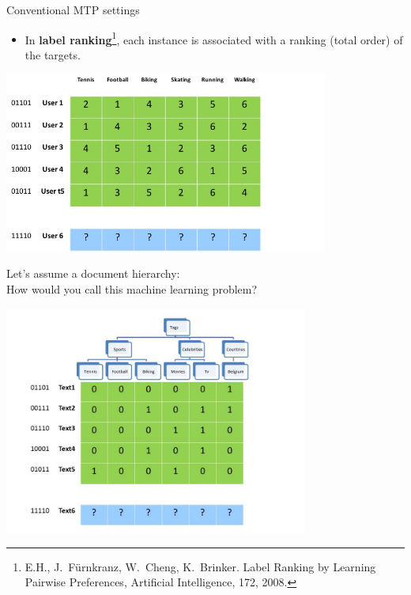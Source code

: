 \documentclass[]{beamer}
\renewcommand{\emph}[1]{\textbf{\color{putblue}#1}}
\begin{document}
\begin{frame}{Conventional MTP settings}
\begin{itemize}
\item
In \emph{label ranking}\footnote{E.H., J.\ F\"urnkranz, W.\ Cheng, K.\ Brinker. Label Ranking by Learning Pairwise Preferences, Artificial Intelligence, 172, 2008.}, each instance is associated with a ranking (total order) of the targets.
\end{itemize}
\begin{center}
\includegraphics[width=0.8\textwidth]{Figures/pictures/labelranking}
\end{center}
\end{frame}





\begin{frame}{Let's assume a document hierarchy: \\
How would you call this machine learning problem?}
\begin{center}
\includegraphics[width=0.75\textwidth,trim = 0 0 100 0,clip]{Figures/pictures/Slide5}
\end{center}
\end{frame}
\end{document}
